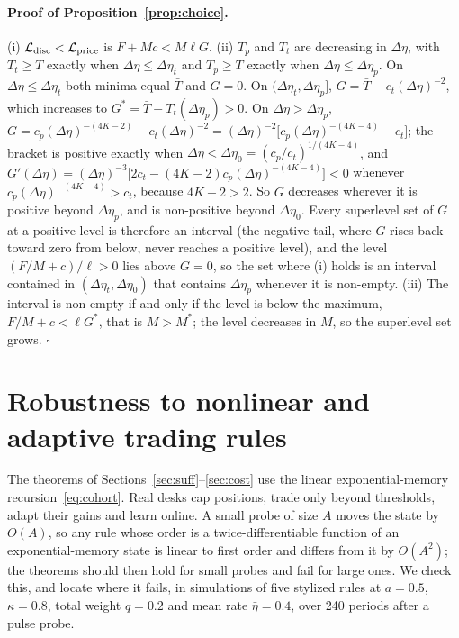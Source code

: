 \documentclass[12pt]{article}
\theoremstyle{definition}
\theoremstyle{remark}
\begin{document}
\paragraph{Proof of Proposition~\ref{prop:choice}.}
 (i) $\mathcal L_{\rm disc}<\mathcal L_{\rm price}$ is $F+Mc<M\ell G$. (ii) $T_p$ and $T_t$ are decreasing in $\Delta\eta$, with $T_t\ge\bar T$ exactly when $\Delta\eta\le\Delta\eta_t$ and $T_p\ge\bar T$ exactly when $\Delta\eta\le\Delta\eta_p$. On $\Delta\eta\le\Delta\eta_t$ both minima equal $\bar T$ and $G=0$. On $(\Delta\eta_t,\Delta\eta_p]$, $G=\bar T-c_t(\Delta\eta)^{-2}$, which increases to $G^*=\bar T-T_t(\Delta\eta_p)>0$. On $\Delta\eta>\Delta\eta_p$, $G=c_p(\Delta\eta)^{-(4K-2)}-c_t(\Delta\eta)^{-2}=(\Delta\eta)^{-2}\bigl[c_p(\Delta\eta)^{-(4K-4)}-c_t\bigr]$; the bracket is positive exactly when $\Delta\eta<\Delta\eta_0=(c_p/c_t)^{1/(4K-4)}$, and $G'(\Delta\eta)=(\Delta\eta)^{-3}\bigl[2c_t-(4K-2)c_p(\Delta\eta)^{-(4K-4)}\bigr]<0$ whenever $c_p(\Delta\eta)^{-(4K-4)}>c_t$, because $4K-2>2$. So $G$ decreases wherever it is positive beyond $\Delta\eta_p$, and is non-positive beyond $\Delta\eta_0$. Every superlevel set of $G$ at a positive level is therefore an interval (the negative tail, where $G$ rises back toward zero from below, never reaches a positive level), and the level $(F/M+c)/\ell>0$ lies above $G=0$, so the set where (i) holds is an interval contained in $(\Delta\eta_t,\Delta\eta_0)$ that contains $\Delta\eta_p$ whenever it is non-empty. (iii) The interval is non-empty if and only if the level is below the maximum, $F/M+c<\ell G^*$, that is $M>M^*$; the level decreases in $M$, so the superlevel set grows. $\square$


\section{Robustness to nonlinear and adaptive trading rules}\label{sec:learners}

The theorems of Sections~\ref{sec:suff}--\ref{sec:cost} use the linear exponential-memory recursion~\eqref{eq:cohort}. Real desks cap positions, trade only beyond thresholds, adapt their gains and learn online. A small probe of size $A$ moves the state by $O(A)$, so any rule whose order is a twice-differentiable function of an exponential-memory state is linear to first order and differs from it by $O(A^2)$; the theorems should then hold for small probes and fail for large ones. We check this, and locate where it fails, in simulations of five stylized rules at $a=0.5$, $\kappa=0.8$, total weight $q=0.2$ and mean rate $\bar\eta=0.4$, over 240 periods after a pulse probe.
\end{document}
